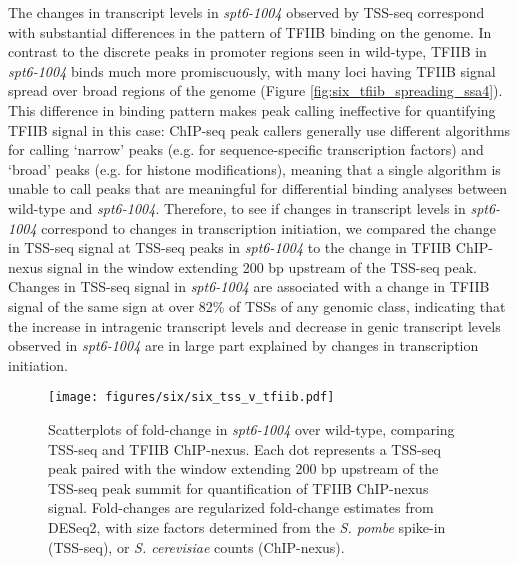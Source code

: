 The changes in transcript levels in \textit{spt6-1004} observed by TSS-seq correspond with substantial differences in the pattern of TFIIB binding on the genome.
In contrast to the discrete peaks in promoter regions seen in wild-type, TFIIB in \textit{spt6-1004} binds much more promiscuously, with many loci having TFIIB signal spread over broad regions of the genome (Figure \ref{fig:six_tfiib_spreading_ssa4}).
This difference in binding pattern makes peak calling ineffective for quantifying TFIIB signal in this case: ChIP-seq peak callers generally use different algorithms for calling `narrow' peaks (e.g. for sequence-specific transcription factors) and `broad' peaks (e.g. for histone modifications), meaning that a single algorithm is unable to call peaks that are meaningful for differential binding analyses between wild-type and \textit{spt6-1004}.
Therefore, to see if changes in transcript levels in \textit{spt6-1004} correspond to changes in transcription initiation, we compared the change in TSS-seq signal at TSS-seq peaks in \textit{spt6-1004} to the change in TFIIB ChIP-nexus signal in the window extending 200 bp upstream of the TSS-seq peak.
Changes in TSS-seq signal in \textit{spt6-1004} are associated with a change in TFIIB signal of the same sign at over 82\% of TSSs of any genomic class, indicating that the increase in intragenic transcript levels and decrease in genic transcript levels observed in \textit{spt6-1004} are in large part explained by changes in transcription initiation.


\begin{figure}[h]
\centering
\texttt{[image: figures/six/six\_tss\_v\_tfiib.pdf]}
\caption[Scatterplots of fold-change in \textit{spt6-1004} over wild-type, comparing TSS-seq and TFIIB ChIP-nexus.]{Scatterplots of fold-change in \textit{spt6-1004} over wild-type, comparing TSS-seq and TFIIB ChIP-nexus. Each dot represents a TSS-seq peak paired with the window extending 200 bp upstream of the TSS-seq peak summit for quantification of TFIIB ChIP-nexus signal. Fold-changes are regularized fold-change estimates from DESeq2, with size factors determined from the \textit{S. pombe} spike-in (TSS-seq), or \textit{S. cerevisiae} counts (ChIP-nexus).}
\end{figure}


